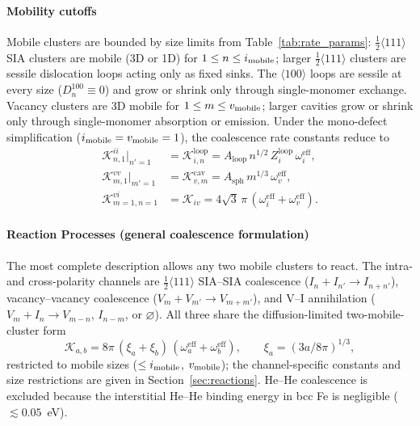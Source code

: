 \paragraph*{Mobility cutoffs}
Mobile clusters are bounded by size limits from Table~\ref{tab:rate_params}:
$\tfrac12\langle111\rangle$ SIA clusters are mobile (3D or 1D) for
$1\leq n\leq i_{\rm mobile}$; larger $\tfrac12\langle111\rangle$ clusters are
sessile dislocation loops acting only as fixed sinks. The $\langle100\rangle$
loops are sessile at every size ($D^{100}_n\equiv 0$) and grow or shrink only
through single-monomer exchange. Vacancy clusters are 3D mobile for
$1\leq m\leq v_{\rm mobile}$; larger cavities grow or shrink only through
single-monomer absorption or emission. Under the mono-defect simplification
($i_{\rm mobile}=v_{\rm mobile}=1$), the coalescence rate constants reduce to
\begin{align}
    \mathcal{K}_{n,1}^{ii}\big|_{n'=1}
    &= \mathcal{K}^{\mathrm{loop}}_{i,n}
     = A_{\mathrm{loop}}\,n^{1/2}\,Z_i^{\mathrm{loop}}\,\omega_i^{\mathrm{eff}},
    \label{eq:monodef_i}\\[4pt]
    \mathcal{K}_{m,1}^{vv}\big|_{m'=1}
    &= \mathcal{K}^{\mathrm{cav}}_{v,m}
     = A_{\mathrm{sph}}\,m^{1/3}\,\omega_v^{\mathrm{eff}},
    \label{eq:monodef_v}\\[4pt]
    \mathcal{K}_{m=1,n=1}^{vi}
    &= \mathcal{K}_{iv}
     = 4\sqrt{3}\,\pi\,(\omega_i^{\mathrm{eff}}+\omega_v^{\mathrm{eff}}).
    \label{eq:monodef_iv}
\end{align}

\paragraph{Reaction Processes (general coalescence formulation)}
\label{sec:reaction_class}
The most complete description allows any two mobile clusters to react. The
intra- and cross-polarity channels are $\tfrac12\langle111\rangle$ SIA--SIA
coalescence ($I_n + I_{n'} \to I_{n+n'}$), vacancy--vacancy coalescence
($V_m + V_{m'} \to V_{m+m'}$), and V--I annihilation
($V_m + I_n \to V_{m-n},\,I_{n-m}$, or $\varnothing$). All three share the
diffusion-limited two-mobile-cluster form
\begin{equation}\label{eq:K_ii}
   \mathcal{K}_{a,b}
   = 8\pi\,(\xi_a + \xi_b)\,
     (\omega_a^{\mathrm{eff}} + \omega_b^{\mathrm{eff}}),
   \qquad \xi_a = (3a/8\pi)^{1/3},
\end{equation}
restricted to mobile sizes ($\leq i_{\rm mobile}$, $v_{\rm mobile}$); the
channel-specific constants and size restrictions are given in
Section~\ref{sec:reactions}. He--He coalescence is excluded because the
interstitial He--He binding energy in bcc Fe is negligible ($\lesssim 0.05$~eV).

